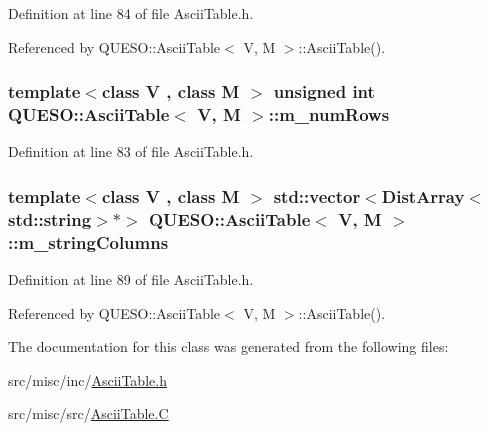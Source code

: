 Definition at line 84 of file Ascii\-Table.\-h.



Referenced by Q\-U\-E\-S\-O\-::\-Ascii\-Table$<$ V, M $>$\-::\-Ascii\-Table().

\hypertarget{class_q_u_e_s_o_1_1_ascii_table_a4f772a7719d36cb0a0908eed37bd1deb}{
\subsubsection[{m\-\_\-num\-Rows}]{\setlength{\rightskip}{0pt plus 5cm}template$<$class V , class M $>$ unsigned int {\bf Q\-U\-E\-S\-O\-::\-Ascii\-Table}$<$ V, M $>$\-::m\-\_\-num\-Rows\hspace{0.3cm}{\ttfamily [private]}}}\label{class_q_u_e_s_o_1_1_ascii_table_a4f772a7719d36cb0a0908eed37bd1deb}


Definition at line 83 of file Ascii\-Table.\-h.

\hypertarget{class_q_u_e_s_o_1_1_ascii_table_a14ba55d29e9a4ddeb14cd5acd8a27268}{
\subsubsection[{m\-\_\-string\-Columns}]{\setlength{\rightskip}{0pt plus 5cm}template$<$class V , class M $>$ std\-::vector$<${\bf Dist\-Array}$<$std\-::string$>$$\ast$$>$ {\bf Q\-U\-E\-S\-O\-::\-Ascii\-Table}$<$ V, M $>$\-::m\-\_\-string\-Columns\hspace{0.3cm}{\ttfamily [private]}}}\label{class_q_u_e_s_o_1_1_ascii_table_a14ba55d29e9a4ddeb14cd5acd8a27268}


Definition at line 89 of file Ascii\-Table.\-h.



Referenced by Q\-U\-E\-S\-O\-::\-Ascii\-Table$<$ V, M $>$\-::\-Ascii\-Table().



The documentation for this class was generated from the following files\-:\begin{DoxyCompactItemize}
\item 
src/misc/inc/\hyperlink{_ascii_table_8h}{Ascii\-Table.\-h}\item 
src/misc/src/\hyperlink{_ascii_table_8_c}{Ascii\-Table.\-C}\end{DoxyCompactItemize}
